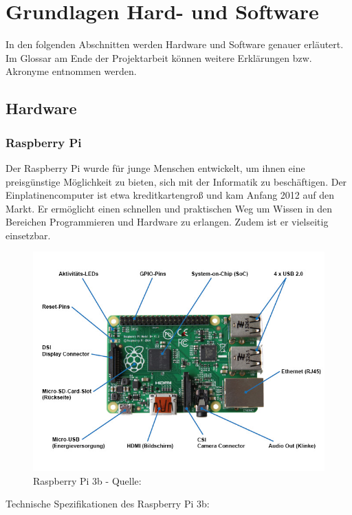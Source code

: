 \documentclass[a4paper,11pt,singlespacing]{article}
\begin{document}
    \section{Grundlagen Hard- und Software}
      	In den folgenden Abschnitten werden Hardware und Software genauer erläutert. Im Glossar am Ende der Projektarbeit können weitere Erklärungen bzw. Akronyme entnommen werden.
      	\subsection{Hardware}
    		\subsubsection{Raspberry Pi}
    			Der Raspberry Pi wurde für junge Menschen entwickelt, um ihnen eine preisgünstige Möglichkeit zu bieten, sich mit der Informatik zu beschäftigen. Der Einplatinencomputer ist etwa kreditkartengroß und kam Anfang 2012 auf den Markt. Er ermöglicht einen schnellen und praktischen Weg um Wissen in den Bereichen Programmieren und Hardware zu erlangen. Zudem ist er vielseitig einsetzbar.
    			\begin{figure}[H]
    				\centering
	    			\includegraphics[scale=0.5]{raspberry_pi_3b}
	    				\caption{Raspberry Pi 3b - Quelle: \cite{Picture_Raspberrypi3b} }
	    				\label{raspberrypi3b}
				\end{figure}
				Technische Spezifikationen des Raspberry Pi 3b:
\end{document}
